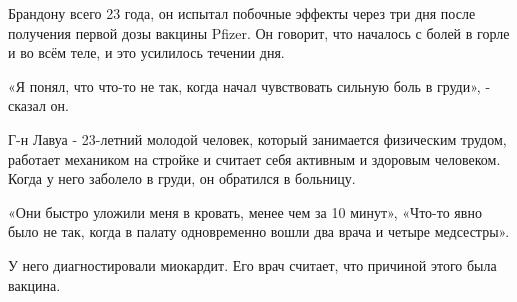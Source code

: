 Брандону всего 23 года, он испытал побочные эффекты через три дня после
получения первой дозы вакцины Pfizer. Он говорит, что началось с болей в горле и
во всём теле, и это усилилось течении дня.

«Я понял, что что-то не так, когда начал чувствовать сильную боль в груди», -
сказал он.

Г-н Лавуа - 23-летний молодой человек, который занимается физическим трудом,
работает механиком на стройке и считает себя активным и здоровым
человеком. Когда у него заболело в груди, он обратился в больницу.

«Они быстро уложили меня в кровать, менее чем за 10 минут», «Что-то явно было не
так, когда в палату одновременно вошли два врача и четыре медсестры».

У него диагностировали миокардит. Его врач считает, что причиной этого была
вакцина.

